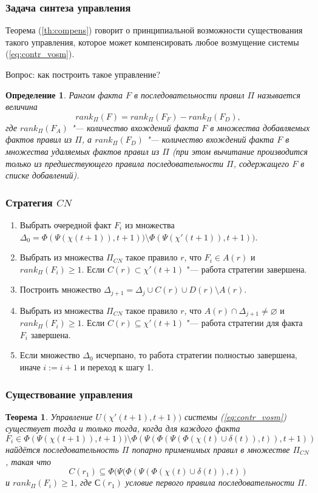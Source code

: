 \documentclass[default]{beamer}
\newtheorem{Theorem}{Теорема}
\newtheorem{Def}{Определение}
\begin{document}
	\begin{frame}
		\frametitle{Задача синтеза управления}
		
		Теорема (\ref{th:compens}) говорит о принципиальной возможности существования такого управления, которое может компенсировать любое возмущение системы (\ref{eq:contr_vosm}).
		
		Вопрос: как построить такое управление?
		
		\begin{Def}
			Рангом факта $F$ в последовательности правил $\Pi$ называется величина
			\begin{equation}
				rank_{\Pi}(F)=rank_{\Pi}(F_F)-rank_{\Pi}(F_D),
			\end{equation}
			где $rank_{\Pi}(F_A)$ "--- количество вхождений факта $F$ в множества добавляемых фактов правил из $\Pi$, а $rank_{\Pi}(F_D)$ "--- количество вхождений факта $F$ в множества удаляемых фактов правил из $\Pi$ (при этом вычитание производится только из предшествующего правила последовательности $\Pi$, содержащего $F$ в списке добавлений).
		\end{Def}
	\end{frame}

	\begin{frame}
		\frametitle{Стратегия $CN$}
		
		\begin{enumerate}
			\item Выбрать очередной факт $F_i$ из множества  $\Delta_0 = \Phi(\Psi(\chi(t+1)),t+1))\setminus \Phi(\Psi(\chi'(t+1)),t+1))$.
			\item Выбрать из множества $\Pi_{CN}$ такое правило $r$, что $F_i\in A(r)$ и $rank_{\Pi}(F_i)\geqslant 1$. Если $C(r)\subset\chi'(t+1)$ "--- работа стратегии завершена.
			\item Построить множество $\Delta_{j+1} = \Delta_j \cup C(r)\cup D(r)\setminus A(r)$.
			\item Выбрать из множества $\Pi_{CN}$ такое правило $r$, что $A(r)\cap\Delta_{j+1}\not=\varnothing$ и $rank_{\Pi}(F_i)\geqslant 1$. Если $C(r)\subseteq\chi'(t+1)$ "--- работа стратегии для факта $F_i$ завершена.
			\item Если множество $\Delta_0$ исчерпано, то работа стратегии полностью завершена, иначе $i := i+1$ и переход к шагу 1.
		\end{enumerate}
	\end{frame}	

	\begin{frame}
		\frametitle{Существование управления}
		
		\begin{Theorem}
			Управление $U(\chi'(t+1),t+1))$ системы (\ref*{eq:contr_vosm}) существует тогда и только тогда, когда для каждого факта
			\[ F_i\in\Phi(\Psi(\chi(t+1)),t+1))\setminus\Phi(\Psi(\Phi(\Psi(\Phi(\chi(t)\cup\delta(t)),t)), t+1))
			\]
			найдётся последовательность $\Pi$ попарно применимых правил в множестве $\Pi_{CN}$, такая что 
			\[
			C(r_1)\subseteq\Phi(\Psi(\Phi(\Psi(\Phi(\chi(t)\cup\delta(t)),t))
			\] 
			и $rank_{\Pi}(F_i)\geqslant 1$, где $С(r_1)$ условие первого правила последовательности $\Pi$.
		\end{Theorem}
	\end{frame}
\end{document}
